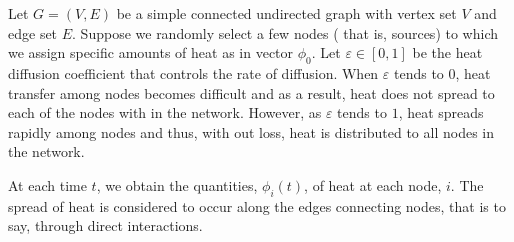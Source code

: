 \documentclass[10pt,a4paper]{article}
\theoremstyle{plain}
\theoremstyle{definition}
\begin{document}
    Let $G=(V,E)$ be a simple connected undirected graph with vertex set $V$ and edge set $E$. Suppose we randomly select a few nodes ( that is, sources) to which we assign specific amounts of heat as in vector $\phi_0$. Let $\varepsilon \in [0,1]$ be the heat diffusion coefficient that controls the rate of diffusion. When $\varepsilon$ tends to $0$, heat transfer among nodes becomes difficult and as a result, heat does not spread to each of the nodes with in the network. However, as $\varepsilon$ tends to $1$, heat spreads rapidly among nodes and thus, with out loss, heat is distributed to all nodes in the network.
    
   At each time $t$, we obtain the quantities, $\phi_i(t)$, of heat at each node, $i$. The spread of heat is considered to occur along the edges connecting nodes, that is to say, through direct interactions.  
    	
\end{document}
